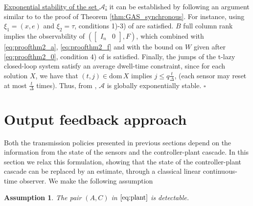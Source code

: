 \documentclass[twocolumn]{autart}
\newtheorem{assumption}{Assumption}
\newcommand{\smallmat}[1]{\left[ \begin{smallmatrix}#1
    \end{smallmatrix} \right]}
\newcommand{\dom}{\mathrm{dom}}
\begin{document}
{ \underline{Exponential stability of the set $\mathcal{A}$:}}
it can be 
established by following an argument similar to 
to the proof of Theorem \ref{thm:GAS_synchronous}.
For instance, using $\xi_1 = (x,e)$ and $\xi_2 = \tau$,
conditions 1)-3) of \cite[Assumption 1]{TeelTAC13}
are satisfied. $B$ full column rank implies the observability
of $(\smallmat{I_n & 0},F)$, which combined with
\eqref{eq:proofthm2_a}, \eqref{eq:proofthm2_f} and with the bound on
$W$ given after \eqref{eq:proofthm2_0}, 
condition 4) of \cite[Assumption 1]{TeelTAC13} 
is satisfied. Finally, the jumps of the t-lazy closed-loop 
system satisfy an average dwell-time constraint, since 
for each solution $X$, we have that
$(t,j)\in \dom\,X$ implies $j \leq q\frac{t}{\Delta}$,
(each sensor may reset at most  $\frac{t}{\Delta}$ times).
Thus, from \cite[Theorem 2]{TeelTAC13}, 
$\mathcal{A}$ is globally exponentially stable.
\hfill \hspace*{1pt} \hfill $\square$












\section{Output feedback approach}
\label{sec:output_feedback}

Both the transmission policies presented in previous sections
depend on the information from the state of the sensors 
and the controller-plant cascade. In this section
we relax this formulation, showing that the state of the controller-plant 
cascade can be replaced by an estimate, through a classical linear
continuous-time observer. We make the following assumption 
\begin{assumption} 
\label{assume:detectability}
 The pair $(A,C)$ in $\eqref{eq:plant}$ is detectable.
\end{assumption}
\end{document}
